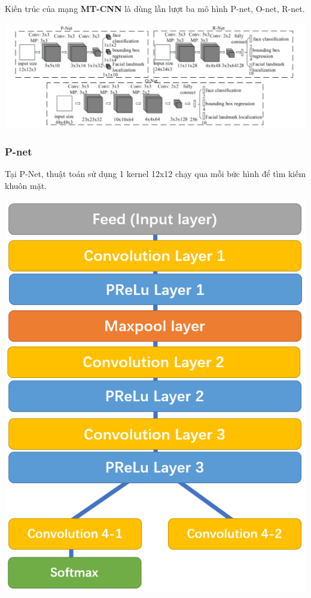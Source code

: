\documentclass[12pt]{extreport}
\begin{document}
Kiến trúc của mạng \textbf{MT-CNN} là dùng lần lượt ba mô hình P-net, O-net, R-net.

\begin{center}
\includegraphics[scale=0.4]{Image/MTCNN_architecture}
\end{center}

\newpage
\subsubsection{P-net}
Tại P-Net, thuật toán sử dụng 1 kernel 12x12 chạy qua mỗi bức hình để tìm kiếm khuôn mặt.

\begin{center}
\includegraphics[scale=0.5]{Image/MTCNN_P_net}
\end{center}
\end{document}
